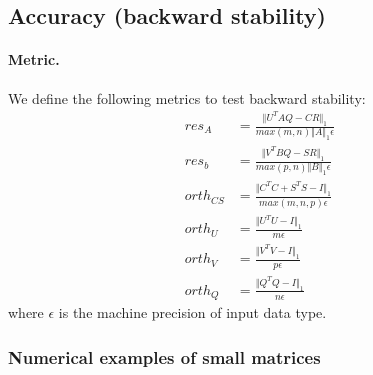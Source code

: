     \subsection{Accuracy (backward stability)}
    \paragraph{Metric.}
    We define the following metrics to test backward stability:
    \begin{align} 
        res_A &= \frac{\Vert U^TAQ - CR\Vert_1}{max(m,n)\Vert A \Vert_1 \epsilon}  \\[0.8em]  \label{backward_error_1}
        res_b &= \frac{\Vert V^TBQ - SR\Vert_1}{max(p,n)\Vert B \Vert_1 \epsilon}  \\[0.8em] 
        orth_{CS} &= \frac{\Vert C^TC + S^{T}S - I\Vert_1}{max(m,n,p) \epsilon} \\[0.8em] 
        orth_U &= \frac{\Vert U^TU - I\Vert_1}{m \epsilon} \\[0.8em]  
        orth_V &= \frac{\Vert V^TV - I\Vert_1}{p \epsilon} \\[0.8em]  
        orth_Q &= \frac{\Vert Q^TQ - I\Vert_1}{n \epsilon} \label{backward_error_5}
    \end{align}
    where $\epsilon$ is the machine precision of input data type.
    
    \subsubsection{Numerical examples of small matrices}

